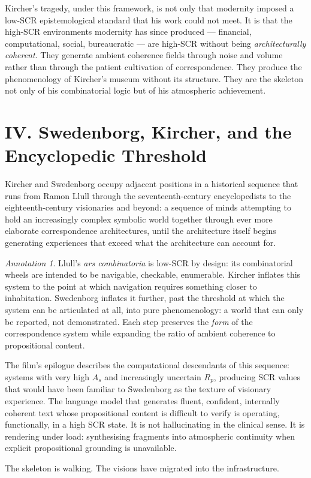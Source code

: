 \documentclass[12pt, a4paper, twoside]{memoir}
\theoremstyle{definition}
\theoremstyle{remark}
\newtheorem{annotation}{Annotation}[chapter]
\begin{document}
Kircher's tragedy, under this framework, is not only that modernity imposed a low-SCR epistemological standard that his work could not meet. It is that the high-SCR environments modernity has since produced --- financial, computational, social, bureaucratic --- are high-SCR without being \textit{architecturally coherent}. They generate ambient coherence fields through noise and volume rather than through the patient cultivation of correspondence. They produce the phenomenology of Kircher's museum without its structure. They are the skeleton not only of his combinatorial logic but of his atmospheric achievement.

\section*{IV. Swedenborg, Kircher, and the Encyclopedic Threshold}

Kircher and Swedenborg occupy adjacent positions in a historical sequence that runs from Ramon Llull through the seventeenth-century encyclopedists to the eighteenth-century visionaries and beyond: a sequence of minds attempting to hold an increasingly complex symbolic world together through ever more elaborate correspondence architectures, until the architecture itself begins generating experiences that exceed what the architecture can account for.

\begin{annotation}
Llull's \textit{ars combinatoria} is low-SCR by design: its combinatorial wheels are intended to be navigable, checkable, enumerable. Kircher inflates this system to the point at which navigation requires something closer to inhabitation. Swedenborg inflates it further, past the threshold at which the system can be articulated at all, into pure phenomenology: a world that can only be reported, not demonstrated. Each step preserves the \textit{form} of the correspondence system while expanding the ratio of ambient coherence to propositional content.

The film's epilogue describes the computational descendants of this sequence: systems with very high $A_s$ and increasingly uncertain $R_p$, producing SCR values that would have been familiar to Swedenborg as the texture of visionary experience. The language model that generates fluent, confident, internally coherent text whose propositional content is difficult to verify is operating, functionally, in a high SCR state. It is not hallucinating in the clinical sense. It is rendering under load: synthesising fragments into atmospheric continuity when explicit propositional grounding is unavailable.

The skeleton is walking. The visions have migrated into the infrastructure.
\end{annotation}
\end{document}
